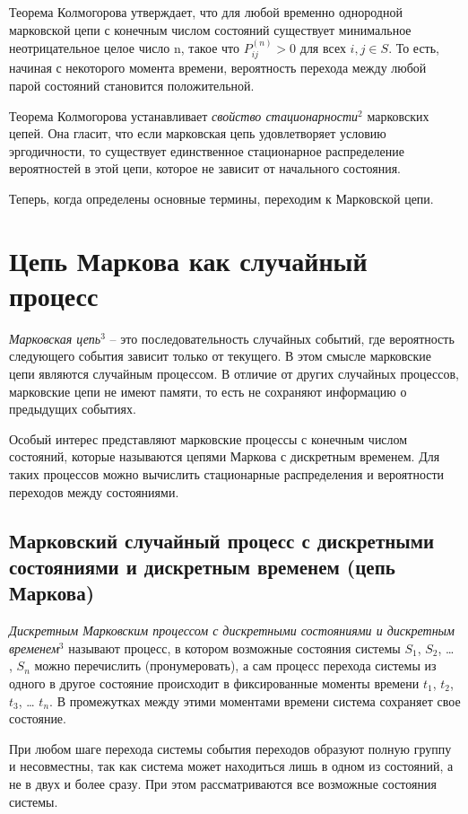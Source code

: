 \documentclass[12pt]{article}
\begin{document}
Теорема Колмогорова утверждает, что для любой временно однородной марковской цепи с конечным числом состояний существует минимальное неотрицательное целое число n, такое что $P_{ij}^{(n)} > 0$ для всех $i,j \in S$. То есть, начиная с некоторого момента времени, вероятность перехода между любой парой состояний становится положительной.

Теорема Колмогорова устанавливает \textit{свойство стационарности$^2$} марковских цепей. Она гласит, что если марковская цепь удовлетворяет условию эргодичности, то существует единственное стационарное распределение вероятностей в этой цепи, которое не зависит от начального состояния.

Теперь, когда определены основные термины, переходим к Марковской цепи.

\section{Цепь Маркова как случайный процесс}

\textit{Марковская цепь$^3$} – это последовательность случайных событий, где вероятность следующего события зависит только от текущего. В этом смысле марковские цепи являются случайным процессом. В отличие от других случайных процессов, марковские цепи не имеют памяти, то есть не сохраняют информацию о предыдущих событиях.

Особый интерес представляют марковские процессы с конечным числом состояний, которые называются цепями Маркова с дискретным временем. Для таких процессов можно вычислить стационарные распределения и вероятности переходов между состояниями.

\subsection{Марковский случайный процесс с дискретными состояниями и дискретным временем (цепь Маркова)}

\textit{Дискретным Марковским процессом с дискретными состояниями и дискретным временем$^3$} называют процесс, в котором возможные состояния системы $S_1$, $S_2$, … , $S_n$ можно перечислить (пронумеровать), а сам процесс перехода системы из одного в другое состояние происходит в фиксированные моменты времени $t_1$, $t_2$, $t_3$, … $t_n$. В промежутках между этими моментами времени система сохраняет свое состояние.

При любом шаге перехода системы события переходов образуют полную группу и несовместны, так как система может находиться лишь в одном из состояний, а не в двух и более сразу. При этом рассматриваются
все возможные состояния системы. 
\end{document}
